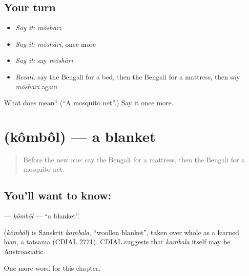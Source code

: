 \subsection*{Your turn}
\begin{itemize}
\raggedright
  \item \emph{Say it:} \emph{môshāri}
  \item \emph{Say it:} \emph{môshāri}, once more
  \item \emph{Say it:} say \emph{môshāri}
  \item \emph{Recall:} say the Bengali for a bed, then the Bengali for a mattress, then say \emph{môshāri} again
\end{itemize}

\begin{tcolorbox}[breakable,colback=teal!4,colframe=teal!35!black,title={Before you move on}]
What does  mean? (\textquotedblleft{}A mosquito net\textquotedblright{}.) Say it once more.
\end{tcolorbox}
\section[\texorpdfstring{\bn{কম্বল} (kômbôl)}{কম্বল (kômbôl)}]{ (kômbôl) — a blanket}

\label{lesson:BN-C133-kombol}



\begin{quote}
Before the new one: say the Bengali for a mattress, then the Bengali for a mosquito net.
\end{quote}

\subsection*{You'll want to know: }
\textbf{} — \emph{kômbôl} — \textquotedblleft{}a blanket\textquotedblright{}.

\begin{cousinweb}
\textbf{} (\emph{kômbôl}) is Sanskrit \emph{kambala}, \textquotedblleft{}woollen blanket\textquotedblright{}, taken over whole as a learned loan, a tatsama (CDIAL 2771). CDIAL suggests that \emph{kambala} itself may be Austroasiatic.
\end{cousinweb}

\begin{grammarlens}[title={What you've built}]
One more word for this chapter.
\end{grammarlens}

